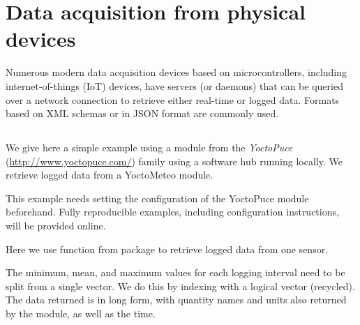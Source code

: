 \documentclass[krantz2]{krantz}\usepackage{knitr}
\newcommand{\href}[2]{\emph{#2} (\url{#1})}
\begin{document}
\section{Data acquisition from physical devices}\label{sec:data:acquisition}

Numerous modern data acquisition devices based on microcontrollers, including internet-of-things (IoT) devices, have servers (or daemons) that can be queried over a network connection to retrieve either real-time or logged data. Formats based on XML schemas or in JSON format are commonly used.

\subsection[jsonlite]{}



We give here a simple example using a module from the \href{http://www.yoctopuce.com/}{YoctoPuce} family using a software hub running locally. We retrieve logged data from a YoctoMeteo module.

\begin{infobox}
This example needs setting the configuration of the YoctoPuce module beforehand. Fully reproducible examples, including configuration instructions, will be provided online.
\end{infobox}

Here we use function  from package  to retrieve logged data from one sensor.

\begin{knitrout}\footnotesize
{}\color{fgcolor}\begin{kframe}
\begin{alltt}
 \hlkwb{<-} 
 \hlkwb{<-}
    \hlstd{(} \hlstd{,}
                    \hlstd{=} \hlstd{),}  \hlstd{=} \hlstd{)}
  \hlstd{=} \hlstd{)}
\end{alltt}
\end{kframe}
\end{knitrout}

The minimum, mean, and maximum values for each logging interval need to be split from a single vector. We do this by indexing with a logical vector (recycled). The data returned is in long form, with quantity names and units also returned by the module, as well as the time.
\end{document}
